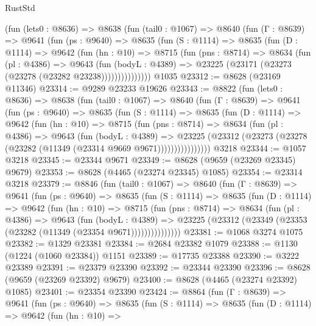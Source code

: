\begin{lexlean}{RustStd}
\begin{coremodule}
      (fun (lets0 : @8636) =>
      @8638
        (fun (tail0 : @1067) =>
        @8640
          (fun (Γ : @8639) =>
          @9641
            (fun (ps : @9640) =>
            @8635
              (fun (S : @1114) =>
              @8635
                (fun (D : @1114) =>
                @9642
                  (fun (hn : @10) =>
                  @8715
                    (fun (pns : @8714) =>
                    @8634
                      (fun (pl : @4386) =>
                      @9643
                        (fun (bodyL : @4389) =>
                        @23225 (@23171 (@23273 (@23278 (@23282 @23238)))))))))))))))
    @1035
@23312 := @8628 (@23169 @11346)
@23314 := @9289 @23233 @19626
@23343 := @8822
    (fun (lets0 : @8636) =>
    @8638
      (fun (tail0 : @1067) =>
      @8640
        (fun (Γ : @8639) =>
        @9641
          (fun (ps : @9640) =>
          @8635
            (fun (S : @1114) =>
            @8635
              (fun (D : @1114) =>
              @9642
                (fun (hn : @10) =>
                @8715
                  (fun (pns : @8714) =>
                  @8634
                    (fun (pl : @4386) =>
                    @9643
                      (fun (bodyL : @4389) =>
                      @23225
                        (@23312 (@23273 (@23278 (@23282 (@11349 (@23314 @9669 @9671))))))))))))))))
    @3218
@23344 := @1057 @3218
@23345 := @23344 @9671
@23349 := @8628 (@9659 (@23269 @23345) @9679)
@23353 := @8628 (@4465 (@23274 @23345) @1085)
@23354 := @23314 @3218
@23379 := @8846
    (fun (tail0 : @1067) =>
    @8640
      (fun (Γ : @8639) =>
      @9641
        (fun (ps : @9640) =>
        @8635
          (fun (S : @1114) =>
          @8635
            (fun (D : @1114) =>
            @9642
              (fun (hn : @10) =>
              @8715
                (fun (pns : @8714) =>
                @8634
                  (fun (pl : @4386) =>
                  @9643
                    (fun (bodyL : @4389) =>
                    @23225 (@23312 (@23349 (@23353 (@23282 (@11349 (@23354 @9671)))))))))))))))
@23381 := @1068 @3274 @1075
@23382 := @1329 @23381
@23384 := @2684 @23382 @1079
@23388 := @1130 (@1224 (@1060 @23384)) @1151
@23389 := @17735 @23388
@23390 := @3222 @23389
@23391 := @23379 @23390
@23392 := @23344 @23390
@23396 := @8628 (@9659 (@23269 @23392) @9679)
@23400 := @8628 (@4465 (@23274 @23392) @1085)
@23401 := @23354 @23390
@23424 := @8864
    (fun (Γ : @8639) =>
    @9641
      (fun (ps : @9640) =>
      @8635
        (fun (S : @1114) =>
        @8635
          (fun (D : @1114) =>
          @9642
            (fun (hn : @10) =>

\end{coremodule}
\end{lexlean}
